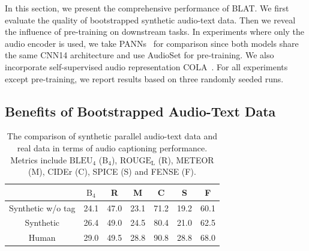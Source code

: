 \documentclass[sigconf]{acmart}
\begin{document}
In this section, we present the comprehensive performance of BLAT.
We first evaluate the quality of bootstrapped synthetic audio-text data.
Then we reveal the influence of pre-training on downstream tasks.
In experiments where only the audio encoder is used, we take PANNs~\cite{kong2020panns} for comparison since both models share the same CNN14 architecture and use AudioSet for pre-training.
We also incorporate self-supervised audio representation COLA~\cite{saeed2021contrastive}.
For all experiments except pre-training, we report results based on three randomly seeded runs.

\subsection{Benefits of Bootstrapped Audio-Text Data}

\begin{table}[ht]
    
    \begin{tabular}{c|cccccc}
    \toprule
    & $\text{B}_4$ & R & M & C & S & F\\
    \midrule
    Synthetic w/o tag & 24.1 & 47.0 & 23.1 & 71.2 & 19.2 & 60.1\\
    Synthetic & 26.4 & 49.0 & 24.5 & 80.4 & 21.0 & 62.5\\
    Human & 29.0 & 49.5 & 28.8 & 90.8 & 28.8 & 68.0\\
    \bottomrule
    \end{tabular}
    \caption{The comparison of synthetic parallel audio-text data and real data in terms of audio captioning performance. Metrics include $\text{BLEU}_4$ ($\text{B}_4$), $\text{ROUGE}_\text{L}$ (R), METEOR (M), CIDEr (C), SPICE (S) and FENSE (F).}
    \label{tab:syn_data_quality}
\end{table}
\end{document}
